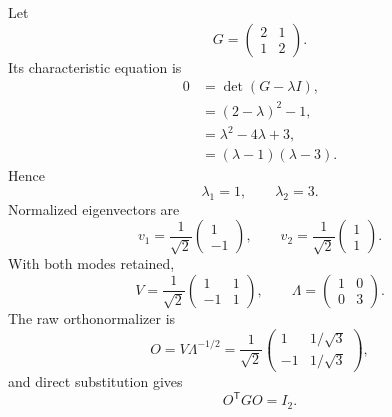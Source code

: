 \documentclass[10pt,twocolumn]{article}
\begin{document}
Let
\begin{equation}
G=
\begin{pmatrix}
2&1\\1&2
\end{pmatrix}.
\label{eq:bridge-example-gram}
\end{equation}
Its characteristic equation is
\begin{align}
0&=\det(G-\lambda I),
\label{eq:bridge-example-char-1}\\
&=(2-\lambda)^2-1,
\label{eq:bridge-example-char-2}\\
&=\lambda^2-4\lambda+3,
\label{eq:bridge-example-char-3}\\
&=(\lambda-1)(\lambda-3).
\label{eq:bridge-example-char-4}
\end{align}
Hence
\begin{equation}
\lambda_1=1,
\qquad
\lambda_2=3.
\label{eq:bridge-example-values}
\end{equation}
Normalized eigenvectors are
\begin{equation}
v_1=\frac1{\sqrt2}
\begin{pmatrix}1\\-1\end{pmatrix},
\qquad
v_2=\frac1{\sqrt2}
\begin{pmatrix}1\\1\end{pmatrix}.
\label{eq:bridge-example-vectors}
\end{equation}
With both modes retained,
\begin{equation}
V=\frac1{\sqrt2}
\begin{pmatrix}
1&1\\-1&1
\end{pmatrix},
\qquad
\Lambda=
\begin{pmatrix}
1&0\\0&3
\end{pmatrix}.
\label{eq:bridge-example-eigensystem}
\end{equation}
The raw orthonormalizer is
\begin{equation}
O=V\Lambda^{-1/2}
=\frac1{\sqrt2}
\begin{pmatrix}
1&1/\sqrt3\\
-1&1/\sqrt3
\end{pmatrix},
\label{eq:bridge-example-orthonormalizer}
\end{equation}
and direct substitution gives
\begin{equation}
O^{\mathsf T}GO=I_2.
\label{eq:bridge-example-white-identity}
\end{equation}
\end{document}
